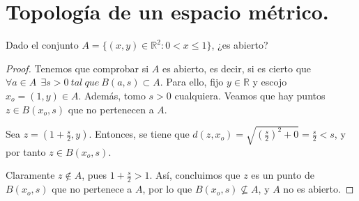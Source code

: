 %
%
%

\section{Topología de un espacio métrico.}

\begin{ejer}
Dado el conjunto $A = \{ (x,y)\in \mathbb{R}^2: 0 < x \le 1 \}$, ¿es abierto?

\begin{proof}
Tenemos que comprobar si $A$ es abierto, es decir, si es cierto que\\
$\forall a \in A \ \ \exists s>0\ tal\ que\ B(a,s)\subset A$. Para ello, fijo $y \in \mathbb{R}$ y escojo $x_o = (1,y) \in A$. Además, tomo $s>0$ cualquiera. Veamos que hay puntos $z \in B(x_o, s)$ que no pertenecen a $A$.

Sea $\displaystyle z = (1 + \frac{s}{2}, y)$. Entonces, se tiene que $\displaystyle d(z,x_o)= \sqrt{\left(\frac{s}{2}\right)^2 + 0} = \frac{s}{2} < s$, y por tanto $z \in B(x_o,s)$.

Claramente $z\notin A$, pues $\displaystyle 1 + \frac{s}{2} > 1$. Así, concluimos que $z$ es un punto de $B(x_o,s)$ que no pertenece a $A$, por lo que $\displaystyle B(x_o,s) \not \subseteq A$, y $A$ no es abierto. \qedhere

\end{proof}

\end{ejer}

